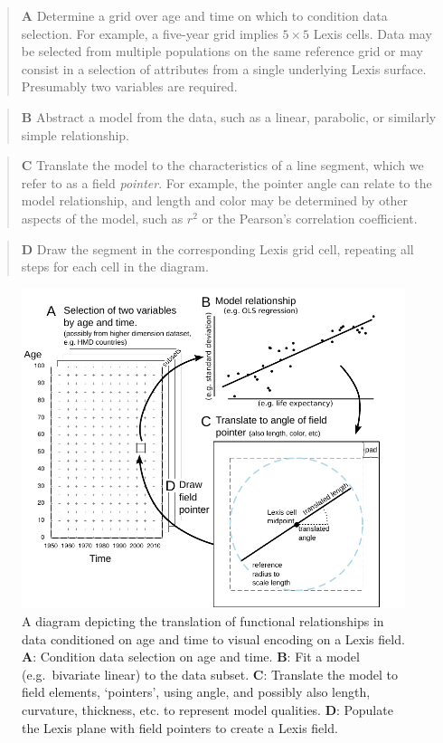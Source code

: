 \documentclass[10pt, twoside, parskip=half]{article}
\begin{document}
\begin{quote}
\textbf{A} Determine a grid over age and time on which to condition data selection. For example, a five-year grid implies \(5\times 5\) Lexis cells. Data may be selected from multiple populations on the same reference grid or may consist in a selection of attributes from a single underlying Lexis surface. Presumably two variables are required.
\end{quote}

\begin{quote}
\textbf{B} Abstract a model from the data, such as a linear, parabolic, or similarly simple relationship.
\end{quote}

\begin{quote}
\textbf{C} Translate the model to the characteristics of a line segment, which we refer to as a field \emph{pointer}. For example, the pointer angle can relate to the model relationship, and length and color may be determined by other aspects of the model, such as \(r^2\) or the Pearson's correlation coefficient.
\end{quote}

\begin{quote}
\textbf{D} Draw the segment in the corresponding Lexis grid cell, repeating all steps for each cell in the diagram.
\end{quote}



\begin{figure}[!t]
\includegraphics[width=1\linewidth]{Figures/ExplainerDiagram} \caption{A diagram depicting the translation of functional relationships in data conditioned on age and time to visual encoding on a Lexis field. \textbf{A}: Condition data selection on age and time. \textbf{B}: Fit a model (e.g.~bivariate linear) to the data subset. \textbf{C}: Translate the model to field elements, `pointers', using angle, and possibly also length, curvature, thickness, etc. to represent model qualities. \textbf{D}: Populate the Lexis plane with field pointers to create a Lexis field.}\label{fig:one}
\end{figure}
\FloatBarrier
\end{document}
